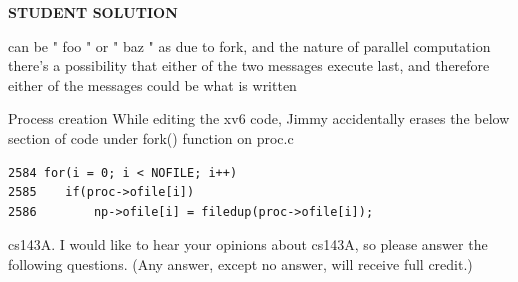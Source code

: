 \documentclass[11pt]{exam}
\begin{document}
\begin{questions}
\begin{parts}
\textbf{STUDENT SOLUTION } 
\begin{adjustwidth}{1.5em}{1em}
can be
"
foo
"
or
" 
baz
"
as due to fork, and the nature of parallel computation there's a possibility that either of the two messages execute last, and therefore either of the messages could be what is written
\end{adjustwidth}
  \vfill

\end{parts}

\addpoints
\question Process creation
While editing the xv6 code, Jimmy accidentally erases the below section of
code under fork() function on proc.c
\begin{verbatim}
2584 for(i = 0; i < NOFILE; i++)
2585    if(proc->ofile[i])
2586        np->ofile[i] = filedup(proc->ofile[i]);
\end{verbatim}


\newpage
\addpoints

\question cs143A. I would like to hear your opinions about cs143A, so please answer the following questions. (Any answer, except
no answer, will receive full credit.)



\end{questions}
\end{document}
